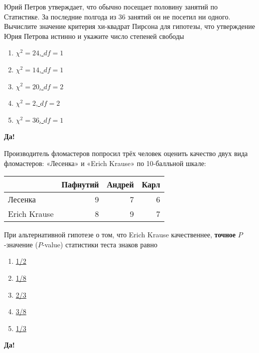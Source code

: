 \documentclass[t]{beamer}
\begin{document}
 \begin{frame} \label{23-Yes} 
\begin{block}{23} 

 Юрий Петров утверждает, что обычно посещает половину занятий по Статистике. За последние полгода из 36 занятий он не посетил ни одного. Вычислите значение критерия хи-квадрат Пирсона для гипотезы, что утверждение Юрия Петрова истинно и укажите число степеней свободы
  


 \end{block} 
\begin{enumerate} 
\item[] \hyperlink{23-No}{\beamergotobutton{} $\chi^2 = 24$, $df=1$}
\item[] \hyperlink{23-No}{\beamergotobutton{} $\chi^2 = 14$, $df=1$}
\item[] \hyperlink{23-No}{\beamergotobutton{} $\chi^2 = 20$, $df=2$}
\item[] \hyperlink{23-No}{\beamergotobutton{} $\chi^2 = 2$, $df=2$}
\item[] \hyperlink{23-Yes}{\beamergotobutton{} $\chi^2 = 36$, $df=1$}
\end{enumerate} 

 \textbf{Да!} 
 \hyperlink{24}{}\end{frame} 


 \begin{frame} \label{24-Yes} 
\begin{block}{24} 

  Производитель фломастеров попросил трёх человек оценить качество двух вида фломастеров: «Лесенка» и «Erich Krause» по 10-балльной шкале:

\begin{center}
\begin{tabular}{lrrr} \toprule
 & Пафнутий & Андрей & Карл \\
\midrule
Лесенка & 9 & 7 & 6 \\
Erich Krause & 8 & 9 & 7 \\
\bottomrule
\end{tabular}
\end{center}

При альтернативной гипотезе о том, что Erich Krause качественнее, \textbf{точное} $P$-значение ($P$-value) статистики теста знаков равно

  


 \end{block} 
\begin{enumerate} 
\item[] \hyperlink{24-Yes}{\beamergotobutton{} 1/2}
\item[] \hyperlink{24-No}{\beamergotobutton{} 1/8}
\item[] \hyperlink{24-No}{\beamergotobutton{} 2/3}
\item[] \hyperlink{24-No}{\beamergotobutton{} 3/8}
\item[] \hyperlink{24-No}{\beamergotobutton{} 1/3}
\end{enumerate} 

 \textbf{Да!} 
 \hyperlink{25}{}\end{frame} 
\end{document}
